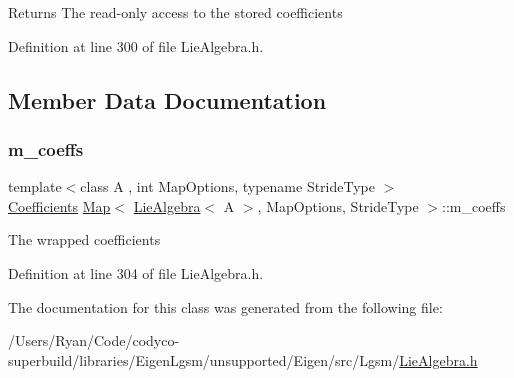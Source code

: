 \begin{DoxyReturn}{Returns}
The read-\/only access to the stored coefficients 
\end{DoxyReturn}


Definition at line 300 of file Lie\+Algebra.\+h.



\subsection{Member Data Documentation}
\hypertarget{class_map_3_01_lie_algebra_3_01_a_01_4_00_01_map_options_00_01_stride_type_01_4_ad9d42724afc3ed4f287a0a3f7a9de6e4}{}\label{class_map_3_01_lie_algebra_3_01_a_01_4_00_01_map_options_00_01_stride_type_01_4_ad9d42724afc3ed4f287a0a3f7a9de6e4} 
\subsubsection{\texorpdfstring{m\+\_\+coeffs}{m\_coeffs}}
{\footnotesize\ttfamily template$<$class A , int Map\+Options, typename Stride\+Type $>$ \\
\hyperlink{class_map_3_01_lie_algebra_3_01_a_01_4_00_01_map_options_00_01_stride_type_01_4_a32e1cab48693733071a98e9f558d4c82}{Coefficients} \hyperlink{class_map_3_01_lie_algebra_3_01_a_01_4_00_01_map_options_00_01_stride_type_01_4_a5e320dd14d4d47929d7a4d48014a735f}{Map}$<$ \hyperlink{class_lie_algebra}{Lie\+Algebra}$<$ A $>$, Map\+Options, Stride\+Type $>$\+::m\+\_\+coeffs\hspace{0.3cm}{\ttfamily [protected]}}

The wrapped coefficients 

Definition at line 304 of file Lie\+Algebra.\+h.



The documentation for this class was generated from the following file\+:\begin{DoxyCompactItemize}
\item 
/\+Users/\+Ryan/\+Code/codyco-\/superbuild/libraries/\+Eigen\+Lgsm/unsupported/\+Eigen/src/\+Lgsm/\hyperlink{_lie_algebra_8h}{Lie\+Algebra.\+h}\end{DoxyCompactItemize}
